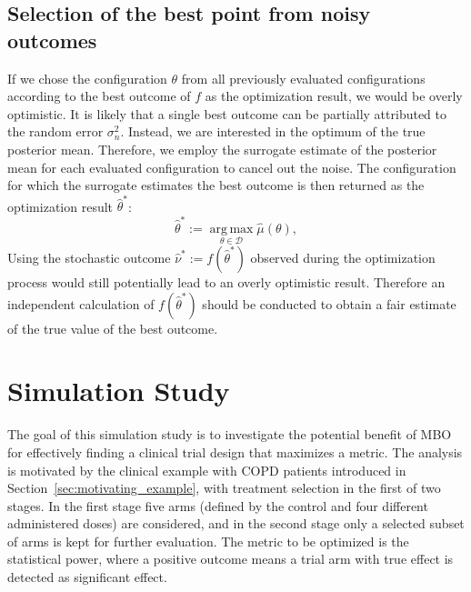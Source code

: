 \documentclass[bimj,fleqn]{w-art}
\theoremstyle{plain}
\theoremstyle{definition}
\begin{document}
\subsection{Selection of the best point from noisy outcomes}
\label{ssec:best_point}
If we chose the configuration $\theta$ from all previously evaluated configurations according to the best outcome of $f$ as the optimization result, we would be overly optimistic.
It is likely that a single best outcome can be partially attributed to the random error $\sigma_{n}^2$.
Instead, we are interested in the optimum of the true posterior mean.
Therefore, we employ the surrogate estimate of the posterior mean for each evaluated configuration to cancel out the noise.
The configuration for which the surrogate estimates the best outcome is then returned as the optimization result $\hat{\theta}^\ast$:
\begin{equation}
  \hat{\theta}^{\ast} := \operatorname{arg\,max}\limits_{\theta \in \mathcal{D}} \hat{\mu}(\theta),
\end{equation}
Using the stochastic outcome $\hat{\nu}^\ast := f(\hat{\theta}^\ast) $ observed during the optimization process would still potentially lead to an overly optimistic result.
Therefore an independent calculation of $f(\hat{\theta}^\ast)$ should be conducted to obtain a fair estimate of the true value of the best outcome.

\clearpage

\section{Simulation Study}
\label{sec:simulation_study}

The goal of this simulation study is to investigate the potential benefit of MBO for effectively finding a clinical trial design that maximizes a metric.
The analysis is motivated by the clinical example with COPD patients introduced in Section~\ref{sec:motivating_example}, with treatment selection in the first of two stages.
In the first stage five arms (defined by the control and four different administered doses) are considered, and in the second stage only a selected subset of arms is kept for further evaluation. 
The metric to be optimized is the statistical power, where a positive outcome means a trial arm with true effect is detected as significant effect.
\end{document}
